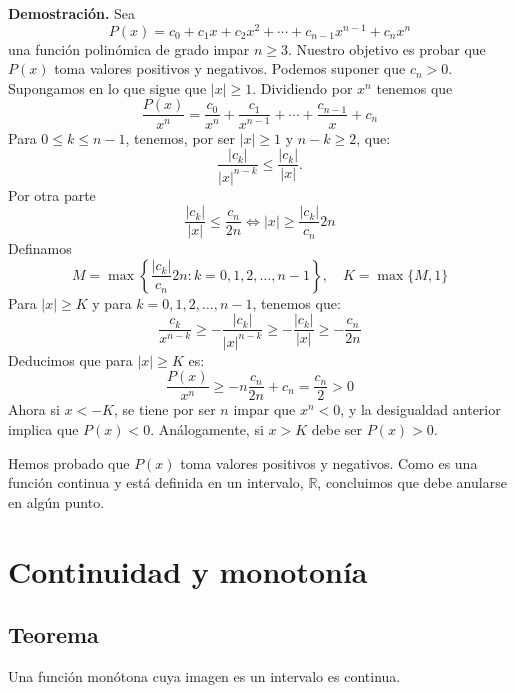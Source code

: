 \documentclass[10pt,a4paper]{article}
\begin{document}
	\textbf{Demostración. }Sea
	$$P(x) = c_0 + c_1x + c_2x^2 + \cdots + c_{n-1}x^{n-1} + c_n x^n$$
	una función polinómica de grado impar $n \geq 3$. Nuestro objetivo es probar que $P(x)$ toma valores positivos y negativos. Podemos suponer que $c_n > 0$. Supongamos en lo que sigue que $|x| \geq 1$. Dividiendo por $x^n$ tenemos que 
	$$\dfrac{P(x)}{x^n} = \dfrac{c_0}{x^n} + \dfrac{c_1}{x^{n-1}} + \cdots + \dfrac{c_{n-1}}{x} + c_n$$
	Para $0 \leq k \leq n-1$, tenemos, por ser $|x| \geq 1$ y $n - k \geq 2$, que:
	$$\dfrac{|c_k|}{|x|^{n-k}} \leq \dfrac{|c_k|}{|x|}.$$
	Por otra parte 
	$$\dfrac{|c_k|}{|x|} \leq \dfrac{c_n}{2n} \Longleftrightarrow |x| \geq \dfrac{|c_k|}{c_n}2n$$
	Definamos 
	$$M = \max\left\{\dfrac{|c_k|}{c_n}2n : k = 0, 1, 2, \dots, n-1\right\}, \quad K = \max\{M, 1\}$$
	Para $|x| \geq K$ y para $k = 0, 1, 2, \dots, n-1$, tenemos que:
	$$\dfrac{c_k}{x^{n-k}} \geq - \dfrac{|c_k|}{|x|^{n-k}} \geq - \dfrac{|c_k|}{|x|} \geq - \dfrac{c_n}{2n}$$
	Deducimos que para $|x| \geq K$ es:
	$$\dfrac{P(x)}{x^n} \geq -n\dfrac{c_n}{2n} + c_n = \dfrac{c_n}{2} > 0$$
	Ahora si $x < -K$, se tiene por ser $n$ impar que $x^n < 0$, y la desigualdad anterior implica que $P(x) < 0$. Análogamente, si $x > K$ debe ser $P(x) > 0$.
	
	Hemos probado que $P(x)$ toma valores positivos y negativos. Como es una función continua y está definida en un intervalo, $\mathbb{R}$, concluimos que debe anularse en algún punto.
	
	\newpage
	
	\section{Continuidad y monotonía}
	
	\subsection{Teorema}
	Una función monótona cuya imagen es un intervalo es continua.
	
\end{document}
